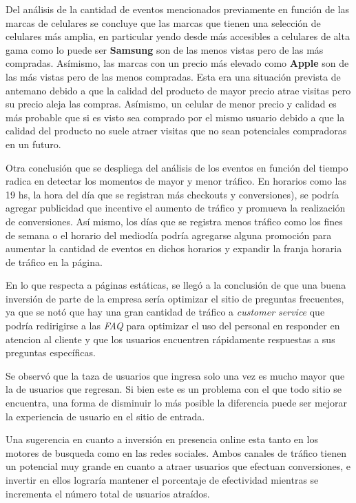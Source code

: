 \documentclass[a4paper]{article}
\begin{document}
Del análisis de la cantidad de eventos mencionados previamente en función de las marcas de celulares se concluye que las marcas que tienen una selección de celulares más amplia, en particular yendo desde más accesibles a celulares de alta gama como lo puede ser \textbf{Samsung} son de las menos vistas pero de las más compradas. Asímismo, las marcas con un precio más elevado como \textbf{Apple} son de las más vistas pero de las menos compradas. Esta era una situación prevista de antemano debido a que la calidad del producto de mayor precio atrae visitas pero su precio aleja las compras. Asímismo, un celular de menor precio y calidad es más probable que si es visto sea comprado por el mismo usuario debido a que la calidad del producto no suele atraer visitas que no sean potenciales compradoras en un futuro. 

Otra conclusión que se despliega del análisis de los eventos en función del tiempo radica en detectar los momentos de mayor y menor tráfico. En horarios como las 19 hs, la hora del día que se registran más checkouts y conversiones), se podría agregar publicidad que incentive el aumento de tráfico y promueva la realización de conversiones. Así mismo, los días que se registra menos tráfico como los fines de semana o el horario del mediodía podría agregarse alguna promoción para aumentar la cantidad de eventos en dichos horarios y expandir la franja horaria de tráfico en la página.

En lo que respecta a páginas estáticas, se llegó a la conclusión de que una buena inversión de parte de la empresa sería optimizar el sitio de preguntas frecuentes, ya que se notó que hay una gran cantidad de tráfico a \textit{customer service} que podría redirigirse a las \textit{FAQ} para optimizar el uso del personal en responder en atencion al cliente y que los usuarios encuentren rápidamente respuestas a sus preguntas específicas.

Se observó que la taza de usuarios que ingresa solo una vez es mucho mayor que la de usuarios que regresan. Si bien este es un problema con el que todo sitio se encuentra, una forma de disminuir lo más posible la diferencia puede ser mejorar la experiencia de usuario en el sitio de entrada.

Una sugerencia en cuanto a inversión en presencia online esta tanto en los motores de busqueda como en las redes sociales. Ambos canales de tráfico tienen un potencial muy grande en cuanto a atraer usuarios que efectuan conversiones, e invertir en ellos lograría mantener el porcentaje de efectividad mientras se incrementa el número total de usuarios atraídos.
\end{document}
